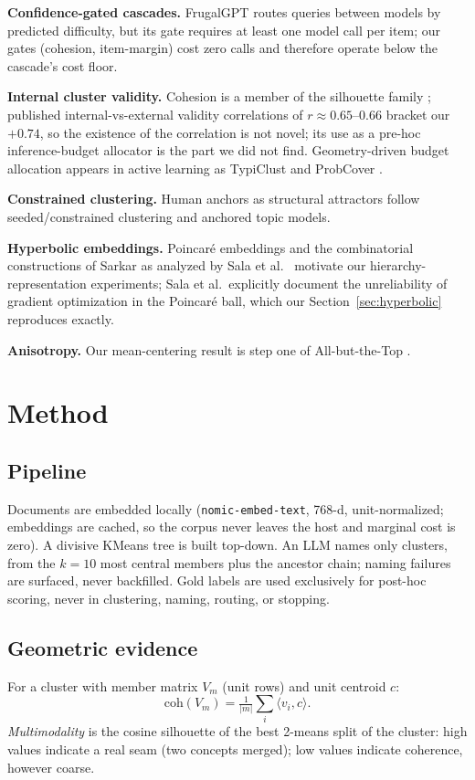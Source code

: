 \documentclass[11pt]{article}
\newcommand{\coh}{\mathrm{coh}}
\begin{document}
\textbf{Confidence-gated cascades.} FrugalGPT \cite{frugalgpt} routes queries between models by predicted difficulty, but its gate requires at least one model call per item; our gates (cohesion, item-margin) cost zero calls and therefore operate below the cascade's cost floor.

\textbf{Internal cluster validity.} Cohesion is a member of the silhouette family \cite{rousseeuw1987}; published internal-vs-external validity correlations of $r\approx0.65$--$0.66$ bracket our $+0.74$, so the existence of the correlation is not novel; its use as a pre-hoc inference-budget allocator is the part we did not find. Geometry-driven budget allocation appears in active learning as TypiClust \cite{typiclust} and ProbCover \cite{probcover}.

\textbf{Constrained clustering.} Human anchors as structural attractors follow seeded/constrained clustering \cite{basu2002} and anchored topic models.

\textbf{Hyperbolic embeddings.} Poincar\'e embeddings \cite{nickel2017} and the combinatorial constructions of Sarkar \cite{sarkar2011} as analyzed by Sala et al.\ \cite{sala2018} motivate our hierarchy-representation experiments; Sala et al.\ explicitly document the unreliability of gradient optimization in the Poincar\'e ball, which our Section~\ref{sec:hyperbolic} reproduces exactly.

\textbf{Anisotropy.} Our mean-centering result is step one of All-but-the-Top \cite{mu2018}.

\section{Method}\label{sec:method}

\subsection{Pipeline}
Documents are embedded locally (\texttt{nomic-embed-text}, 768-d, unit-normalized; embeddings are cached, so the corpus never leaves the host and marginal cost is zero). A divisive KMeans tree is built top-down. An LLM names only clusters, from the $k{=}10$ most central members plus the ancestor chain; naming failures are surfaced, never backfilled. Gold labels are used exclusively for post-hoc scoring, never in clustering, naming, routing, or stopping.

\subsection{Geometric evidence}
For a cluster with member matrix $V_m$ (unit rows) and unit centroid $c$:
\[
\coh(V_m) = \tfrac{1}{|m|}\textstyle\sum_i \langle v_i, c\rangle .
\]
\emph{Multimodality} is the cosine silhouette of the best 2-means split of the cluster: high values indicate a real seam (two concepts merged); low values indicate coherence, however coarse.
\end{document}

